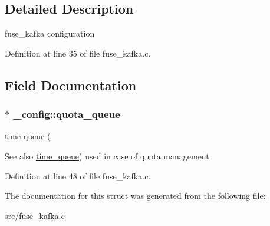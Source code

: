 \subsection{\-Detailed \-Description}
fuse\-\_\-kafka configuration 

\-Definition at line 35 of file fuse\-\_\-kafka.\-c.



\subsection{\-Field \-Documentation}
\hypertarget{struct__config_a145aaea5a1685bb59a5187bb4f2c5829}{
\subsubsection[{quota\-\_\-queue}]{$\ast$ {\bf \-\_\-config\-::quota\-\_\-queue}}}\label{struct__config_a145aaea5a1685bb59a5187bb4f2c5829}


time queue ( 

\begin{DoxySeeAlso}{\-See also}
\hyperlink{structtime__queue}{time\-\_\-queue}) used in case of quota management 
\end{DoxySeeAlso}


\-Definition at line 48 of file fuse\-\_\-kafka.\-c.



\-The documentation for this struct was generated from the following file\-:\begin{DoxyCompactItemize}
\item 
src/\hyperlink{fuse__kafka_8c}{fuse\-\_\-kafka.\-c}\end{DoxyCompactItemize}
